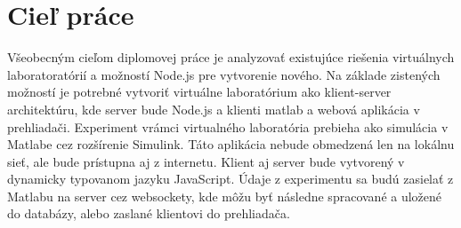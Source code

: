 
\section{Cieľ práce}
Všeobecným cieľom diplomovej práce je analyzovať existujúce riešenia virtuálnych laboratoratórií a možností Node.js pre vytvorenie nového.
Na základe zistených možností je potrebné vytvoriť virtuálne laboratórium ako klient-server architektúru, kde server bude Node.js a klienti matlab a webová aplikácia v prehliadači. Experiment vrámci virtualného laboratória prebieha ako simulácia v Matlabe cez rozšírenie Simulink. Táto aplikácia nebude obmedzená len na lokálnu sieť, ale bude prístupna aj z internetu. Klient aj server bude vytvorený v dynamicky typovanom jazyku JavaScript. Údaje z experimentu sa budú zasielať z Matlabu na server cez websockety, kde môžu byť následne spracované a uložené do databázy, alebo zaslané klientovi do prehliadača.


